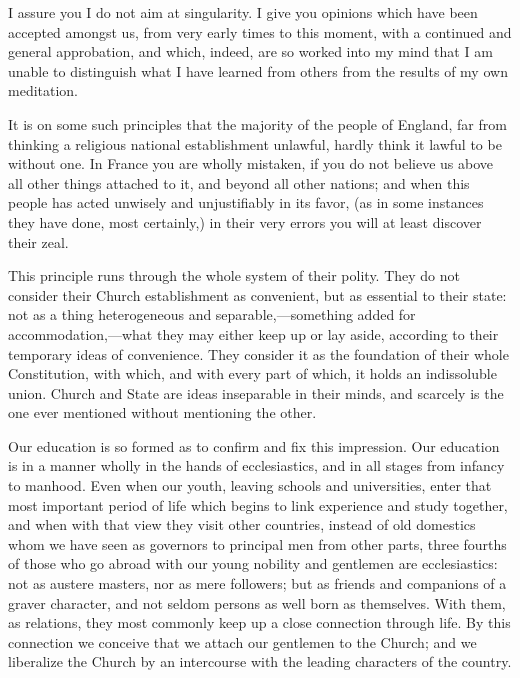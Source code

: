 I assure you I do not aim at singularity. I give you opinions which have been accepted amongst us, from very early times to this moment, with a continued and general approbation, and which, indeed, are so worked into my mind that I am unable to distinguish what I have learned from others from the results of my own meditation.

It is on some such principles that the majority of the people of England, far from thinking a religious national establishment unlawful, hardly think it lawful to be without one. In France you are wholly mistaken, if you do not believe us above all other things attached to it, and beyond all other nations; and when this people has acted unwisely and unjustifiably in its favor, (as in some instances they have done, most certainly,) in their very errors you will at least discover their zeal.

This principle runs through the whole system of their polity. They do not consider their Church establishment as convenient, but as essential to their state: not as a thing heterogeneous and separable,—something added for accommodation,—what they may either keep up or lay aside, according to their temporary ideas of convenience. They consider it as the foundation of their whole Constitution, with which, and with every part of which, it holds an indissoluble union. Church and State are ideas inseparable in their minds, and scarcely is the one ever mentioned without mentioning the other.

Our education is so formed as to confirm and fix this impression. Our education is in a manner wholly in the hands of ecclesiastics, and in all stages from infancy to manhood. Even when our youth, leaving schools and universities, enter that most important period of life which begins to link experience and study together, and when with that view they visit other countries, instead of old domestics whom we have seen as governors to principal men from other parts, three fourths of those who go abroad with our young nobility and gentlemen are ecclesiastics: not as austere masters, nor as mere followers; but as friends and companions of a graver character, and not seldom persons as well born as themselves. With them, as relations, they most commonly keep up a close connection through life. By this connection we conceive that we attach our gentlemen to the Church; and we liberalize the Church by an intercourse with the leading characters of the country.

